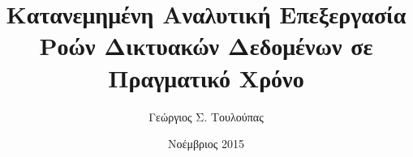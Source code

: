 \documentclass[diploma]{softlab-thesis}
\begin{document}

\frontmatter

\title{Κατανεμημένη Αναλυτική Επεξεργασία Ροών Δικτυακών Δεδομένων σε Πραγματικό Χρόνο}
\author{Γεώργιος Σ. Τουλούπας}
\date{Νοέμβριος 2015}



\maketitle















\renewcommand{\contentsname}{Contents}
\renewcommand{\listtablename}{List of Tables}
\renewcommand{\listfigurename}{List of Figures}

\tableofcontents
\listoftables
\listoffigures



\mainmatter

\renewcommand{\chaptername}{Chapter}
\renewcommand{\figurename}{Figure}
\renewcommand{\tablename}{Table}
\renewcommand{\pagesname}{Pages}
\renewcommand{\refname}{References}
\renewcommand{\bibname}{Bibliography}
\renewcommand{\indexname}{Index}
\renewcommand{\appendixname}{Appendix}

\begin{english}






\end{english}





\end{document}
